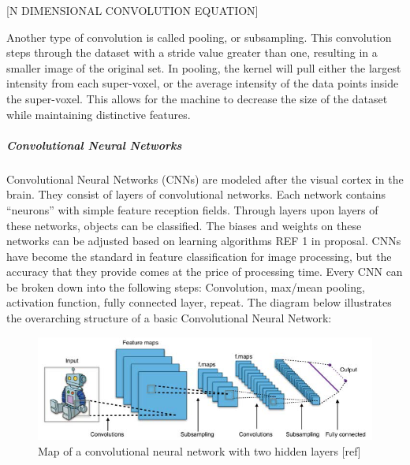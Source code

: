 \documentclass[12pt]{drexelthesis}
\begin{document}
[N DIMENSIONAL CONVOLUTION EQUATION]

Another type of convolution is called pooling, or subsampling. This convolution steps through the dataset with a stride value greater than one, resulting in a smaller image of the original set. In pooling, the kernel will pull either the largest intensity from each super-voxel, or the average intensity of the data points inside the super-voxel. This allows for the machine to decrease the size of the dataset while maintaining distinctive features.

\subparagraph{Convolutional Neural Networks}
Convolutional Neural Networks (CNNs) are modeled after the visual cortex in the brain. They consist of layers of convolutional networks. Each network contains “neurons” with simple feature reception fields. Through layers upon layers of these networks, objects can be classified. The biases and weights on these networks can be adjusted based on learning algorithms REF 1 in proposal. CNNs have become the standard in feature classification for image processing, but the accuracy that they provide comes at the price of processing time. 
Every CNN can be broken down into the following steps: Convolution, max/mean pooling, activation function, fully connected layer, repeat. The diagram below illustrates the overarching structure of a basic Convolutional Neural Network:
\begin{figure}
\centering
\includegraphics[width=6in]{cnn.png}
\caption[High level flow chart of a convolutional neural network]{Map of a convolutional neural network with two hidden layers [ref]}
\end{figure}
\end{document}
